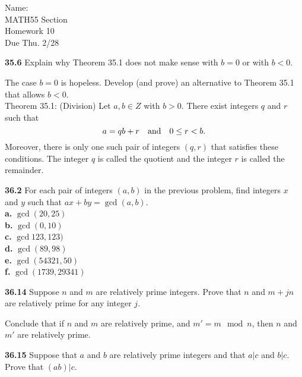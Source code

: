\documentclass[10pt]{article}
\begin{document}
\begin{flushright}
	Name: \underline{\hspace{3cm}} \\
	MATH55 Section \underline{\hspace{0.5cm}} \\
	Homework 10 \\
	Due Thu. 2/28
\end{flushright}


\begin{framed}
	\textbf{35.6} Explain why Theorem 35.1 does not make sense with $b = 0$ or with $b < 0$.

	\noindent The case $b = 0$ is hopeless. Develop (and prove) an alternative to Theorem 35.1
	that allows $b < 0$.\\

	\noindent Theorem 35.1: (Division) Let $a, b \in Z$ with $b > 0$. 
	There exist integers $q$ and $r$ such that 
	$$
		a = qb + r \text{\hspace{1em}and\hspace{1em}} 0 \leq r < b.
	$$
	Moreover, there is only one such pair of integers $(q,r)$ that satisfies these conditions.
	The integer $q$ is called the quotient and the integer $r$ is called the remainder.
\end{framed}

\pagebreak

\begin{framed}
	\textbf{36.2} For each pair of integers $(a,b)$ in the previous problem, 
	find integers $x$ and $y$ such that
	$ax + by = \gcd(a,b)$.\\

	\indent \textbf{a.} $\gcd(20,25)$\\
	\indent \textbf{b.} $\gcd(0,10)$\\
	\indent \textbf{c.} $\gcd123,123)$\\
	\indent \textbf{d.} $\gcd(89,98)$\\
	\indent \textbf{e.} $\gcd(54321,50)$\\
	\indent \textbf{f.} $\gcd(1739,29341)$
\end{framed}

\pagebreak

\begin{framed}
	\textbf{36.14} Suppose $n$ and $m$ are relatively prime integers. 
	Prove that $n$ and $m+jn$ are relatively
	prime for any integer $j$.

	Conclude that if $n$ and $m$ are relatively prime, and $m' = m \mod n$, 
	then $n$ and $m'$ are relatively prime.
\end{framed}

\pagebreak

\begin{framed}
	\textbf{36.15} Suppose that $a$ and $b$ are relatively prime integers and 
	that $a|c$ and $b|c$. Prove that $(ab)|c$.
\end{framed}
\end{document}
